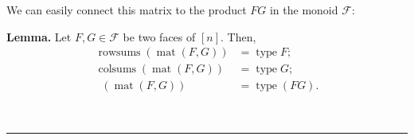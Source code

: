 \documentclass[12pt]{article}
\theoremstyle{definition}%
\newtheorem{lem}[thm]{Lemma}
\theoremstyle{definition}%
\theoremstyle{remark}%
\newcommand{\interval}[1]{\left[ #1 \right]} %
\newcommand{\CF}{\mathcal{F}}
\newcommand{\rowsums}{\operatorname{rowsums}}
\newcommand{\colsums}{\operatorname{colsums}}
\newcommand{\readb}{\mathop{\overline{\operatorname{read}}}}
\newcommand{\mat}{\operatorname{mat}}
\newcommand{\type}{\operatorname{type}}
\newenvironment{lem}[1][Lemma]{\noindent\textbf{#1.} }{\ \rule{0.5em}{0.5em}}
\begin{document}
We can easily connect this matrix to the product $FG$ in the monoid
$\CF $:

\begin{lem}
\label{lem.face-int-mat.type}Let $F,G\in\CF $ be two faces of
$\interval{n}$. Then,
\begin{align}
\rowsums \left(  \mat\left(  F,G\right)  \right)
&  =\type F;\label{eq.lem.face-int-mat.type.F}\\
\colsums \left(  \mat\left(  F,G\right)  \right)
&  =\type G;\label{eq.lem.face-int-mat.type.G}\\
\readb \left(  \mat\left(  F,G\right)
\right)   &  =\type \left(  FG\right)  .
\label{eq.lem.face-int-mat.type.FG}
\end{align}

\end{lem}
\end{document}
